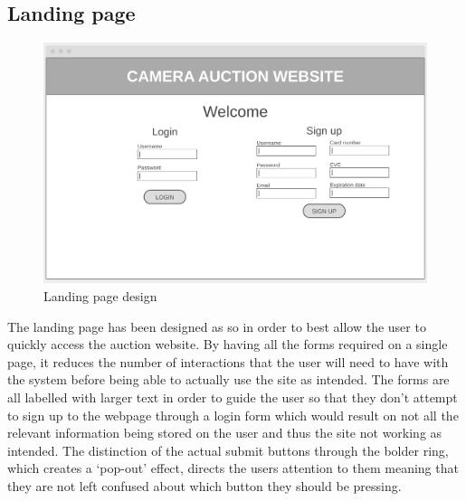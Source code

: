\subsection{Landing page}
\begin{figure}[H]
    \centering
    \includegraphics[scale=0.35]{ch2_design/wire_landing.png}
    \caption{Landing page design}
    \label{fig:wire_landing}
\end{figure}
The landing page has been designed as so in order to best allow the user to quickly access the auction website. By having all the forms required on a single page, it reduces the number of interactions that the user will need to have with the system before being able to actually use the site as intended. The forms are all labelled with larger text in order to guide the user so that they don’t attempt to sign up to the webpage through a login form which would result on not all the relevant information being stored on the user and thus the site not working as intended. The distinction of the actual submit buttons through the bolder ring, which creates a ‘pop-out’ effect, directs the users attention to them meaning that they are not left confused about which button they should be pressing.

